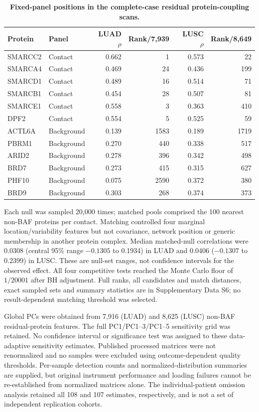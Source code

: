 \documentclass[11pt,letterpaper]{article}
\begin{document}
\begin{table}[H]\centering\small
\caption{\textbf{Fixed-panel positions in the complete-case residual protein-coupling scans.}}\label{tab:proteome_ranks}
\begin{tabular}{llrrrr}\toprule
Protein & Panel & LUAD $\rho$ & Rank/7,939 & LUSC $\rho$ & Rank/8,649 \\
\midrule
SMARCC2 & Contact & 0.662 & 1 & 0.573 & 22 \\
SMARCA4 & Contact & 0.469 & 24 & 0.436 & 199 \\
SMARCD1 & Contact & 0.489 & 16 & 0.514 & 71 \\
SMARCB1 & Contact & 0.454 & 28 & 0.507 & 81 \\
SMARCE1 & Contact & 0.558 & 3 & 0.363 & 410 \\
DPF2 & Contact & 0.554 & 5 & 0.525 & 59 \\
ACTL6A & Background & 0.139 & 1583 & 0.189 & 1719 \\
PBRM1 & Background & 0.270 & 440 & 0.338 & 517 \\
ARID2 & Background & 0.278 & 396 & 0.342 & 498 \\
BRD7 & Background & 0.273 & 415 & 0.315 & 627 \\
PHF10 & Background & 0.075 & 2590 & 0.372 & 380 \\
BRD9 & Background & 0.303 & 268 & 0.374 & 373 \\
\bottomrule\end{tabular}\end{table}

Each null was sampled 20,000 times; matched pools comprised the 100 nearest non-BAF proteins per contact. Matching controlled four marginal location/variability features but not covariance, network position or generic membership in another protein complex. Median matched-null correlations were 0.0308 (central 95\% range $-0.1305$ to 0.1934) in LUAD and 0.0406 ($-0.1307$ to 0.2399) in LUSC. These are null-set ranges, not confidence intervals for the observed effect. All four competitive tests reached the Monte Carlo floor of $1/20001$ after BH adjustment. Full ranks, all candidates and match distances, exact sampled sets and summary statistics are in Supplementary Data S6; no result-dependent matching threshold was selected.

Global PCs were obtained from 7,916 (LUAD) and 8,625 (LUSC) non-BAF residual-protein features. The full PC1/PC1--3/PC1--5 sensitivity grid was retained. No confidence interval or significance test was assigned to these data-adaptive sensitivity estimates. Published processed matrices were not renormalized and no samples were excluded using outcome-dependent quality thresholds. Per-sample detection counts and normalized-distribution summaries are supplied, but original instrument performance and loading failures cannot be re-established from normalized matrices alone. The individual-patient omission analysis retained all 108 and 107 estimates, respectively, and is not a set of independent replication cohorts.
\end{document}
